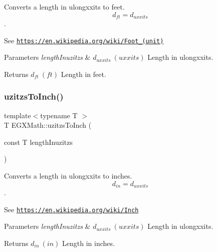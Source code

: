 Converts a length in ulongxxits to feet. \[ d_{ft}=d_{uxxits} \]. 

See \href{https://en.wikipedia.org/wiki/Foot_(unit)}{\tt https\+://en.\+wikipedia.\+org/wiki/\+Foot\+\_\+(unit)} 
\begin{DoxyParams}{Parameters}
{\em length\+Inuzitzs} & $ d_{uxxits}\ (uxxits)$ Length in ulongxxits. \\
\hline
\end{DoxyParams}
\begin{DoxyReturn}{Returns}
$ d_{ft}\ (ft)$ Length in feet. 
\end{DoxyReturn}
\mbox{\label{group___e_g_x_math-_conversions-_length_conversions-uzitzs-_imperial_gad471f5c0b894eb0f2850a19347306ed4}} 
\subsubsection{\texorpdfstring{uzitzs\+To\+Inch()}{uzitzsToInch()}}
{\footnotesize\ttfamily template$<$typename T $>$ \\
T E\+G\+X\+Math\+::uzitzs\+To\+Inch (\begin{DoxyParamCaption}\item[{const T}]{length\+Inuzitzs }\end{DoxyParamCaption})}



Converts a length in ulongxxits to inches. \[ d_{in}=d_{uxxits} \]. 

See \href{https://en.wikipedia.org/wiki/Inch}{\tt https\+://en.\+wikipedia.\+org/wiki/\+Inch} 
\begin{DoxyParams}{Parameters}
{\em length\+Inuzitzs} & $ d_{uxxits}\ (uxxits)$ Length in ulongxxits. \\
\hline
\end{DoxyParams}
\begin{DoxyReturn}{Returns}
$ d_{in}\ (in)$ Length in inches. 
\end{DoxyReturn}
\mbox{\label{group___e_g_x_math-_conversions-_length_conversions-uzitzs-_imperial_ga53d4abecb2e7ac39c15c4ef89b9447a9}} 
